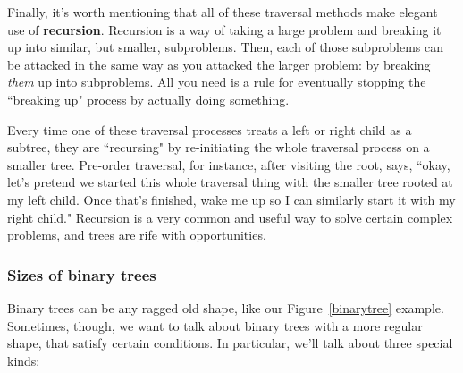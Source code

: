 Finally, it's worth mentioning that all of these traversal methods make
elegant use of \textbf{recursion}. Recursion is a way of taking a large
problem and breaking it up into similar, but smaller, subproblems. Then,
each of those subproblems can be attacked in the same way as you attacked
the larger problem: by breaking \textit{them} up into subproblems. All you
need is a rule for eventually stopping the ``breaking up" process by
actually doing something.

Every time one of these traversal processes treats a left or right child as
a subtree, they are ``recursing" by re-initiating the whole traversal
process on a smaller tree. Pre-order traversal, for instance, after
visiting the root, says, ``okay, let's pretend we started this whole
traversal thing with the smaller tree rooted at my left child. Once that's
finished, wake me up so I can similarly start it with my right child."
Recursion is a very common and useful way to solve certain complex
problems, and trees are rife with opportunities.


\subsubsection{Sizes of binary trees}

Binary trees can be any ragged old shape, like our Figure~\ref{binarytree}
example. Sometimes, though, we want to talk about binary trees with a more
regular shape, that satisfy certain conditions. In particular, we'll talk
about three special kinds:

